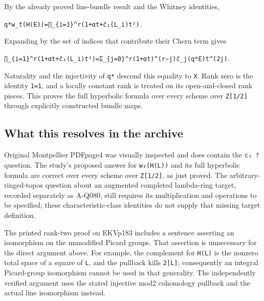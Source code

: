 \documentclass[
  10pt,
]{article}
\begin{document}
By the already proved line-bundle result and the Whitney identities,

\texttt{\small q*w\_\allowbreak{}t(\allowbreak{}H(\allowbreak{}E)\allowbreak{})\allowbreak{}=\allowbreak{}∏\_\allowbreak{}\{i=\allowbreak{}1\}\textasciicircum{}r(\allowbreak{}1+\allowbreak{}αt+\allowbreak{}c̄₁(\allowbreak{}L\_\allowbreak{}i)\allowbreak{}t²)\allowbreak{}}.

Expanding by the set of indices that contribute their Chern term gives

\texttt{\small ∏\_\allowbreak{}\{i=\allowbreak{}1\}\textasciicircum{}r(\allowbreak{}1+\allowbreak{}αt+\allowbreak{}c̄₁(\allowbreak{}L\_\allowbreak{}i)\allowbreak{}t²)\allowbreak{}=\allowbreak{}Σ\_\allowbreak{}\{j=\allowbreak{}0\}\textasciicircum{}r(\allowbreak{}1+\allowbreak{}αt)\allowbreak{}\textasciicircum{}(\allowbreak{}r−j)\allowbreak{}c̄\_\allowbreak{}j(\allowbreak{}q*E)\allowbreak{}t\textasciicircum{}(\allowbreak{}2j)\allowbreak{}}.

Naturality and the injectivity of \texttt{\small q*} descend this
equality to \texttt{\small X}. Rank zero is the identity
\texttt{\small 1=\allowbreak{}1}, and a locally constant rank is treated
on its open-and-closed rank pieces. This proves the full hyperbolic
formula over every scheme over
\texttt{\small Z[\allowbreak{}1/\allowbreak{}2]\allowbreak{}} through
explicitly constructed bundle maps.

\subsection{What this resolves in the
archive}\label{what-this-resolves-in-the-archive}

Original Montpellier PDFpage4 was visually inspected and does contain
the \texttt{\small c₁ ?} question. The study's proposed answer for
\texttt{\small w₂(\allowbreak{}H(\allowbreak{}L)\allowbreak{})\allowbreak{}}
and its full hyperbolic formula are correct over every scheme over
\texttt{\small Z[\allowbreak{}1/\allowbreak{}2]\allowbreak{}}, as just
proved. The arbitrary-ringed-topos question about an augmented completed
lambda-ring target, recorded separately as A-Q080, still requires its
multiplication and operations to be specified; these
characteristic-class identities do not supply that missing target
definition.

The printed rank-two proof on EKVp183 includes a sentence asserting an
isomorphism on the unmodified Picard groups. That assertion is
unnecessary for the direct argument above. For example, the complement
for \texttt{\small H(\allowbreak{}L)\allowbreak{}} is the nonzero total
space of a square of \texttt{\small L}, and the pullback kills
\texttt{\small 2[\allowbreak{}L]\allowbreak{}}; consequently an integral
Picard-group isomorphism cannot be used in that generality. The
independently verified argument uses the stated injective mod2
cohomology pullback and the actual line isomorphism instead.
\end{document}
